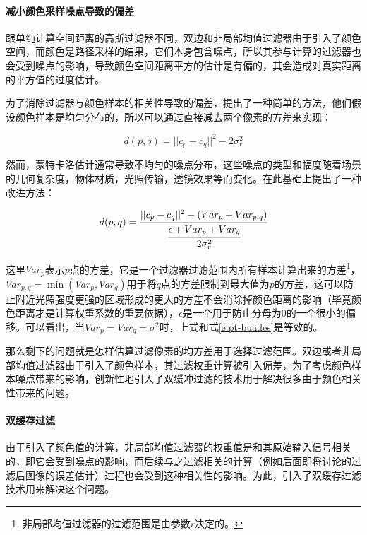 \paragraph{减小颜色采样噪点导致的偏差}
跟单纯计算空间距离的高斯过滤器不同，双边和非局部均值过滤器由于引入了颜色空间，而颜色是路径采样的结果，它们本身包含噪点，所以其参与计算的过滤器也会受到噪点的影响，导致颜色空间距离平方的估计是有偏的，其会造成对真实距离的平方值的过度估计。

为了消除过滤器与颜色样本的相关性导致的偏差，\cite{a:Areviewofimagedenoisingalgorithmswithanewone}提出了一种简单的方法，他们假设颜色样本是均匀分布的，所以可以通过直接减去两个像素的方差来实现：

\begin{equation}\label{e:pt-buades}
	d(p,q)=||c_p-c_q||^{2}-2\sigma^{2}_r
\end{equation}

\noindent 然而，蒙特卡洛估计通常导致不均匀的噪点分布，这些噪点的类型和幅度随着场景的几何复杂度，物体材质，光照传输，透镜效果等而变化。\cite{a:AdaptiveRenderingwithNonLocalMeansFiltering}在此基础上提出了一种改进方法：

\begin{equation}
	d(p,q)= \cfrac{||c_p-c_q||^{2}-(Var_p+Var_{p,q})}{ \cfrac{\epsilon+Var_p+Var_q}{2\sigma^{2}_r}}
\end{equation}

\noindent 这里$Var_p$表示$p$点的方差，它是一个过滤器过滤范围内所有样本计算出来的方差\footnote{非局部均值过滤器的过滤范围是由参数$r$决定的。}，$Var_{p,q}=\min (Var_p,Var_q)$用于将$q$点的方差限制到最大值为$p$的方差，这可以防止附近光照强度更强的区域形成的更大的方差不会消除掉颜色距离的影响（毕竟颜色距离才是计算权重系数的重要依据），$\epsilon$是一个用于防止分母为0的一个很小的偏移。可以看出，当$Var_p=Var_q=\sigma^{2}$时，上式和式\ref{e:pt-buades}是等效的。

那么剩下的问题就是怎样估算过滤像素的均方差用于选择过滤范围。双边或者非局部均值过滤器由于引入了颜色样本，其过滤权重计算被引入偏差，为了考虑颜色样本噪点带来的影响，\cite{a:AdaptiveRenderingwithNonLocalMeansFiltering}创新性地引入了双缓冲过滤的技术用于解决很多由于颜色相关性带来的问题。






\paragraph{双缓存过滤}
由于引入了颜色值的计算，非局部均值过滤器的权重值是和其原始输入信号相关的，即它会受到噪点的影响，而后续与之过滤相关的计算（例如后面即将讨论的过滤后图像的误差估计）过程也会受到这种相关性的影响。为此，\cite{a:AdaptiveRenderingwithNonLocalMeansFiltering}引入了双缓存过滤技术用来解决这个问题。


